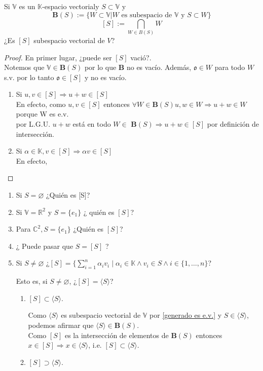 \documentclass[14pt]{extarticle} %
\newcommand{\forceindent}{\leavevmode{\parindent=1em\indent}} %
\theoremstyle{problemastyle} %
\newcommand{\kampo}{\mathbb{K}}
\newcommand{\kev}{$\kampo$-espacio vectorial}
\newcommand{\cero}{\mathfrak{o}} %
\newcommand{\evV}{\mathbb{V}} %
\newcommand{\bb}[1]{\mathbb{#1}}
\newcommand{\generado}[1]{\langle #1 \rangle}
\newcommand{\implica}{\Rightarrow}
\begin{document}
Si $\evV$ es un \kev y $S\subset \evV$ y $$\bm{B}(S) := \{W\subset \evV | W\text{ es subespacio de } \evV \text{ y } S \subset W\}$$
$$[S] := \bigcap_{W\in B(S)} W $$
¿Es $[S]$ subespacio vectorial de $V$?
\begin{proof}

En primer lugar, ¿puede ser $[S]$ vació?.\\
Notemos que $\evV \in \bm{B}(S)$ por lo que $\bm{B}$ no es vacío.
Además, $\cero \in W$ para todo $W$ s.v.  por lo tanto $\cero \in [S]$ y no es vacío.

    \begin{enumerate}
        \item Si $u,v \in [S] \Rightarrow u+w\in [S] $\\
        En efecto, como $u,v \in [S]$ entonces $\forall W \in $$\bm B(S) u,w \in W \Rightarrow u+w \in W$ porque W es e.v.\\
            \forceindent por L.G.U. $u+w$ está en todo $W \in $ $\bm B(S)\Rightarrow u+w \in [S]$ por definición de intersección.
        \item Si $\alpha \in \kampo, v \in [S] \Rightarrow \alpha v \in [S]$\\
        En efecto, 
    \end{enumerate} 
\end{proof}

\begin{enumerate}
    \item Si $S=\varnothing$ ¿Quién es [S]?
    
    \item Si $\evV = \bb R^2$ y $S=\{e_1\}$ ¿ quién es $[S]$?
    
    \item Para $\bb C^2 , S=\{e_1\}$ ¿Quién es $[S]$?
    
    \item ¿ Puede pasar que $S=[S]$ ?
    
    \item Si $S\neq \varnothing $ ¿$[S]=\{\sum_{i=1}^n \alpha_iv_i\;|\; \alpha_i \in \kampo \land v_i \in S \land i\in\{1,\ldots,n \}$?

    Esto es, si $S\neq \varnothing$, ¿$[S]=\langle S\rangle$? 
    \begin{enumerate}
        \item $[S] \subset \langle S \rangle $.

        Como $\langle S \rangle$ es subespacio vectorial de $\evV$ por \ref{generado es e.v.} y $S \in \langle S \rangle $, podemos afirmar que $\langle S \rangle \in \bm B(S)$.\\
        Como $[S]$ es la intersección de elementos de $\bm B(S)$ entonces $x \in [S] \implica x \in \generado S$, i.e. $[S] \subset \generado S$.
        \item $[S] \supset \generado S $.

        \todo{}
    \end{enumerate}
\end{enumerate}
\end{document}
